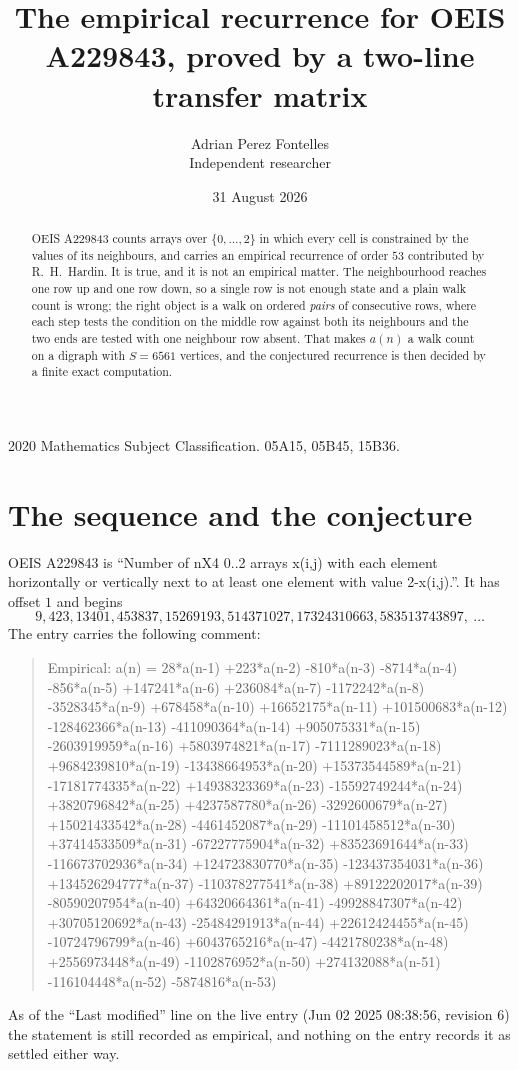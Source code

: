 \documentclass[11pt,a4paper]{article}
\title{The empirical recurrence for OEIS A229843, proved by a two-line transfer matrix}
\author{Adrian Perez Fontelles\\ \small Independent researcher}
\date{31 August 2026}
\theoremstyle{plain}
\theoremstyle{definition}
\begin{document}
\maketitle

\begin{abstract}
OEIS A229843 counts arrays over $\{0,\dots,2\}$ in which every cell is constrained by the
values of its neighbours, and carries an empirical recurrence of order $53$ contributed
by R.~H.~Hardin. It is true, and it is not an empirical matter. The neighbourhood reaches one
row up and one row down, so a single row is not enough state and a plain walk count
is wrong; the right object is a walk on ordered \emph{pairs} of consecutive rows, where
each step tests the condition on the middle row against both its neighbours and the two
ends are tested with one neighbour row absent. That makes $a(n)$ a walk count on a digraph
with $S=6561$ vertices, and the conjectured recurrence is then decided by a finite exact
computation.
\end{abstract}

\noindent\small 2020 Mathematics Subject Classification. 05A15, 05B45, 15B36.\normalsize

\section{The sequence and the conjecture}

OEIS A229843 is ``Number of nX4 0..2 arrays x(i,j) with each element horizontally or vertically next to at least one element with value 2-x(i,j).''. It has offset $1$ and begins
\[
9, 423, 13401, 453837, 15269193, 514371027, 17324310663, 583513743897,\ \dots
\]
The entry carries the following comment:
\begin{quote}\small
Empirical: a(n) = 28*a(n-1) +223*a(n-2) -810*a(n-3) -8714*a(n-4) -856*a(n-5) +147241*a(n-6) +236084*a(n-7) -1172242*a(n-8) -3528345*a(n-9) +678458*a(n-10) +16652175*a(n-11) +101500683*a(n-12) -128462366*a(n-13) -411090364*a(n-14) +905075331*a(n-15) -2603919959*a(n-16) +5803974821*a(n-17) -7111289023*a(n-18) +9684239810*a(n-19) -13438664953*a(n-20) +15373544589*a(n-21) -17181774335*a(n-22) +14938323369*a(n-23) -15592749244*a(n-24) +3820796842*a(n-25) +4237587780*a(n-26) -3292600679*a(n-27) +15021433542*a(n-28) -4461452087*a(n-29) -11101458512*a(n-30) +37414533509*a(n-31) -67227775904*a(n-32) +83523691644*a(n-33) -116673702936*a(n-34) +124723830770*a(n-35) -123437354031*a(n-36) +134526294777*a(n-37) -110378277541*a(n-38) +89122202017*a(n-39) -80590207954*a(n-40) +64320664361*a(n-41) -49928847307*a(n-42) +30705120692*a(n-43) -25484291913*a(n-44) +22612424455*a(n-45) -10724796799*a(n-46) +6043765216*a(n-47) -4421780238*a(n-48) +2556973448*a(n-49) -1102876952*a(n-50) +274132088*a(n-51) -116104448*a(n-52) -5874816*a(n-53)
\end{quote}
As of the ``Last modified'' line on the live entry (Jun 02 2025 08:38:56, revision 6) the statement is
still recorded as empirical, and nothing on the entry records it as settled either way.
\end{document}
